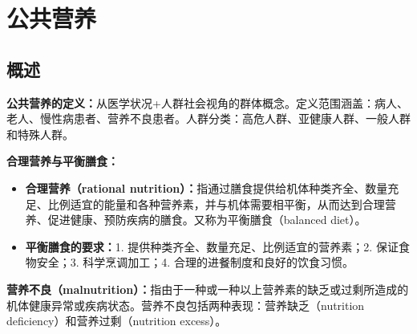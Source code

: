 \chapter{公共营养}

\section{概述}

\begin{defbox}
\textbf{公共营养的定义：}从医学状况+人群社会视角的群体概念。定义范围涵盖：病人、老人、慢性病患者、营养不良患者。人群分类：高危人群、亚健康人群、一般人群和特殊人群。

\textbf{合理营养与平衡膳食：}
\begin{itemize}[leftmargin=*]
    \item \textbf{合理营养（rational nutrition）：}指通过膳食提供给机体种类齐全、数量充足、比例适宜的能量和各种营养素，并与机体需要相平衡，从而达到合理营养、促进健康、预防疾病的膳食。又称为平衡膳食（balanced diet）。
    \item \textbf{平衡膳食的要求：}1. 提供种类齐全、数量充足、比例适宜的营养素；2. 保证食物安全；3. 科学烹调加工；4. 合理的进餐制度和良好的饮食习惯。
\end{itemize}

\textbf{营养不良（malnutrition）：}指由于一种或一种以上营养素的缺乏或过剩所造成的机体健康异常或疾病状态。营养不良包括两种表现：营养缺乏（nutrition deficiency）和营养过剩（nutrition excess）。
\end{defbox}

